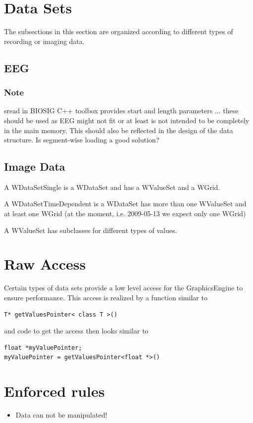 \documentclass[a4paper,12pt]{scrbook}
\begin{document}
\section{Data Sets}
The subsections in this section are organized according to different types of recording or imaging data.
\subsection{EEG}
\subsubsection{Note}
sread in BIOSIG C++ toolbox provides start and length parameters ... these should be used as EEG might not fit or at least is not
intended to be completely in the main memory. This should also be reflected in the design of the data structure.  Is segment-wise
loading a good solution?

\subsection{Image Data}

A WDataSetSingle is a WDataSet and has a WValueSet and a WGrid.

A WDataSetTimeDependent is a WDataSet has more than one WValueSet and at least one WGrid (at the moment, i.e. 2009-05-13 we expect
only one WGrid)

A WValueSet has subclasses for different types of values.

\section{Raw Access}
Certain types of data sets provide a low level access for the GraphicsEngine to ensure performance. This access is realized by a
function similar to
\begin{verbatim}
T* getValuesPointer< class T >()
\end{verbatim}
and code to get the access then looks similar to
\begin{verbatim}
float *myValuePointer;
myValuePointer = getValuesPointer<float *>()
\end{verbatim}

\section{Enforced rules}
\begin{itemize}
\item Data can not be manipulated!
\end{itemize}


\end{document}

